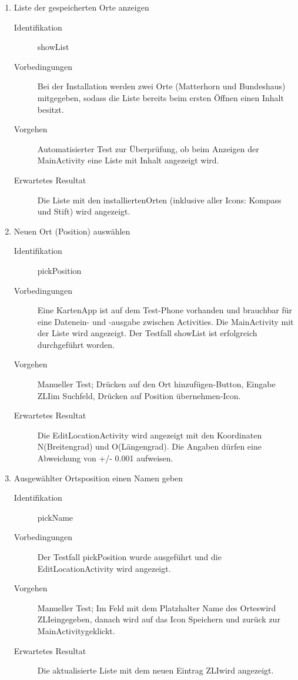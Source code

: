 \documentclass[12pt,a4paper]{scrartcl}
\begin{document}
\begin{enumerate}
  \item Liste der gespeicherten Orte anzeigen

  \begin{description}
    \item [Identifikation] showList
    \item [Vorbedingungen] Bei der Installation werden zwei Orte (Matterhorn und Bundeshaus) mitgegeben, sodass die Liste bereits beim ersten Öffnen einen Inhalt besitzt.
    \item [Vorgehen] Automatisierter Test zur Überprüfung, ob beim Anzeigen der MainActivity eine Liste mit Inhalt angezeigt wird.
    \item [Erwartetes Resultat] Die Liste mit den \dq installierten\dq  Orten (inklusive aller Icons: Kompass und Stift) wird angezeigt.
  \end{description}

  \item Neuen Ort (Position) auswählen

  \begin{description}
    \item [Identifikation] pickPosition
    \item [Vorbedingungen] Eine KartenApp ist auf dem Test-Phone vorhanden und brauchbar für eine Datenein- und -ausgabe zwischen Activities. Die MainActivity mit der Liste wird angezeigt. Der Testfall showList ist erfolgreich durchgeführt worden.
    \item [Vorgehen] Manueller Test; Drücken auf den \dq Ort hinzufügen\dq -Button, Eingabe \dq ZLI\dq im Suchfeld, Drücken auf \dq Position übernehmen\dq -Icon.
    \item [Erwartetes Resultat] Die EditLocationActivity wird angezeigt mit den Koordinaten  N\dq  (Breitengrad) und  O\dq  (Längengrad). Die Angaben dürfen eine Abweichung von +/- 0.001 aufweisen.
  \end{description}

  \pagebreak

  \item Ausgewählter Ortsposition einen Namen geben

  \begin{description}
    \item [Identifikation] pickName
    \item [Vorbedingungen] Der Testfall pickPosition wurde ausgeführt und die EditLocationActivity wird angezeigt.
    \item [Vorgehen] Manueller Test; Im Feld mit dem Platzhalter \dq Name des Ortes\dq  wird \dq ZLI\dq  eingegeben, danach wird auf das Icon \dq Speichern und zurück zur MainActivity\dq  geklickt.
    \item [Erwartetes Resultat] Die aktualisierte Liste mit dem neuen Eintrag \dq ZLI\dq  wird angezeigt.
  \end{description}


\end{enumerate}
\end{document}
